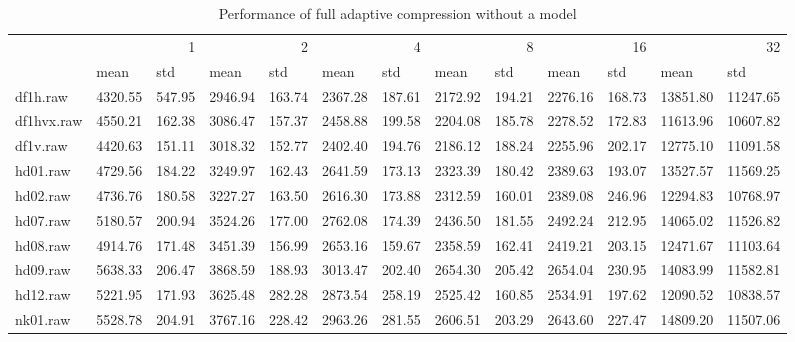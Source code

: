 \begin{table}
\caption{Performance of full adaptive compression without a model}
\begin{tabular}{lllllllllllll}
 & \multicolumn{2}{r}{1} & \multicolumn{2}{r}{2} & \multicolumn{2}{r}{4} & \multicolumn{2}{r}{8} & \multicolumn{2}{r}{16} & \multicolumn{2}{r}{32} \\
 & mean & std & mean & std & mean & std & mean & std & mean & std & mean & std \\
df1h.raw & 4320.55 & 547.95 & 2946.94 & 163.74 & 2367.28 & 187.61 & 2172.92 & 194.21 & 2276.16 & 168.73 & 13851.80 & 11247.65 \\
df1hvx.raw & 4550.21 & 162.38 & 3086.47 & 157.37 & 2458.88 & 199.58 & 2204.08 & 185.78 & 2278.52 & 172.83 & 11613.96 & 10607.82 \\
df1v.raw & 4420.63 & 151.11 & 3018.32 & 152.77 & 2402.40 & 194.76 & 2186.12 & 188.24 & 2255.96 & 202.17 & 12775.10 & 11091.58 \\
hd01.raw & 4729.56 & 184.22 & 3249.97 & 162.43 & 2641.59 & 173.13 & 2323.39 & 180.42 & 2389.63 & 193.07 & 13527.57 & 11569.25 \\
hd02.raw & 4736.76 & 180.58 & 3227.27 & 163.50 & 2616.30 & 173.88 & 2312.59 & 160.01 & 2389.08 & 246.96 & 12294.83 & 10768.97 \\
hd07.raw & 5180.57 & 200.94 & 3524.26 & 177.00 & 2762.08 & 174.39 & 2436.50 & 181.55 & 2492.24 & 212.95 & 14065.02 & 11526.82 \\
hd08.raw & 4914.76 & 171.48 & 3451.39 & 156.99 & 2653.16 & 159.67 & 2358.59 & 162.41 & 2419.21 & 203.15 & 12471.67 & 11103.64 \\
hd09.raw & 5638.33 & 206.47 & 3868.59 & 188.93 & 3013.47 & 202.40 & 2654.30 & 205.42 & 2654.04 & 230.95 & 14083.99 & 11582.81 \\
hd12.raw & 5221.95 & 171.93 & 3625.48 & 282.28 & 2873.54 & 258.19 & 2525.42 & 160.85 & 2534.91 & 197.62 & 12090.52 & 10838.57 \\
nk01.raw & 5528.78 & 204.91 & 3767.16 & 228.42 & 2963.26 & 281.55 & 2606.51 & 203.29 & 2643.60 & 227.47 & 14809.20 & 11507.06 \\
\end{tabular}
\end{table}
